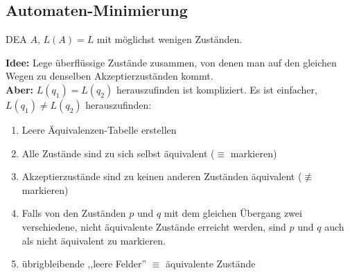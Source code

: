 \documentclass[a4paper]{article}
\begin{document}
\subsection{Automaten-Minimierung} \label{minimizeautomat}
	\begin{fdef}
	DEA $A$, $L(A)=L$ mit möglichst wenigen Zuständen.
	\end{fdef}

	\begin{falgo}[Minimierung]
	\textbf{Idee:} Lege überflüssige Zustände zusammen, von denen man auf den gleichen Wegen zu denselben Akzeptierzuständen kommt. \\
	\textbf{Aber:} $L(q_1)=L(q_2)$ herauszufinden ist kompliziert. Es ist einfacher, $L(q_1) \neq L(q_2)$ herauszufinden:
	\begin{enumerate}
		\item Leere Äquivalenzen-Tabelle erstellen
		\item Alle Zustände sind zu sich selbst äquivalent ($\equiv$ markieren)
		\item Akzeptierzustände sind zu keinen anderen Zuständen äquivalent ($\nequiv$ markieren)
		\item Falls von den Zuständen $p$ und $q$ mit dem gleichen Übergang zwei verschiedene, nicht äquivalente Zustände erreicht werden, sind $p$ und $q$ auch als nicht äquivalent zu markieren.
		\item übrigbleibende ,,leere Felder'' $\equiv$ äquivalente Zustände
	\end{enumerate}
	\end{falgo}
	
\end{document}
